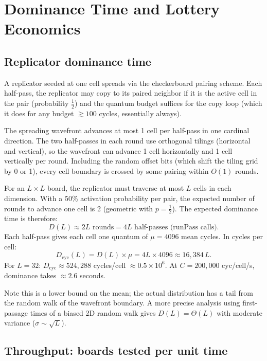 \documentclass{article}
\begin{document}
\section{Dominance Time and Lottery Economics}
\label{sec:dominance}

\subsection{Replicator dominance time}

A replicator seeded at one cell spreads via the checkerboard pairing
scheme. Each half-pass, the replicator may copy to its paired neighbor
if it is the active cell in the pair (probability $\frac{1}{2}$) and
the quantum budget suffices for the copy loop (which it does for any
budget $\gtrsim 100$ cycles, essentially always).

The spreading wavefront advances at most 1 cell per half-pass in one
cardinal direction. The two half-passes in each round use orthogonal
tilings (horizontal and vertical), so the wavefront can advance 1 cell
horizontally and 1 cell vertically per round. Including the random
offset bits (which shift the tiling grid by 0 or 1), every cell
boundary is crossed by some pairing within $O(1)$ rounds.

For an $L \times L$ board, the replicator must traverse at most $L$
cells in each dimension. With a 50\% activation probability per pair,
the expected number of rounds to advance one cell is 2 (geometric
with $p = \frac{1}{2}$). The expected dominance time is therefore:
\[
D(L) \approx 2L \text{ rounds} = 4L \text{ half-passes (runPass calls).}
\]
Each half-pass gives each cell one quantum of $\mu = 4096$ mean cycles.
In cycles per cell:
\[
D_{\text{cyc}}(L) = D(L) \times \mu = 4L \times 4096 \approx 16{,}384 \, L.
\]
For $L = 32$: $D_{\text{cyc}} \approx 524{,}288$ cycles/cell $\approx
0.5 \times 10^6$. At $C = 200{,}000$ cyc/cell/s, dominance takes
$\approx 2.6$ seconds.

Note this is a lower bound on the mean; the actual distribution has a
tail from the random walk of the wavefront boundary. A more precise
analysis using first-passage times of a biased 2D random walk gives
$D(L) = \Theta(L)$ with moderate variance ($\sigma \sim \sqrt{L}$).

\subsection{Throughput: boards tested per unit time}
\end{document}
